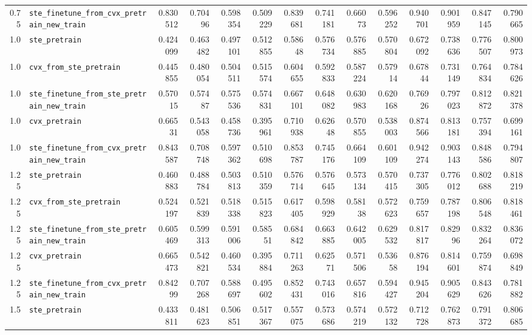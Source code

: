 \begin{longtable}{@{}r l *{12}{r}@{}}
0.75 & \texttt{ste\_finetune\_from\_cvx\_pretrain\_new\_train} & 0.830512 & 0.70496 & 0.598354 & 0.509229 & 0.839681 & 0.741181 & 0.66073 & 0.596252 & 0.940701 & 0.901959 & 0.847145 & 0.790665 \\
1.0 & \texttt{ste\_pretrain} & 0.424099 & 0.463482 & 0.497101 & 0.512855 & 0.58648 & 0.576734 & 0.576885 & 0.570804 & 0.672092 & 0.738636 & 0.776507 & 0.800973 \\
1.0 & \texttt{cvx\_from\_ste\_pretrain} & 0.445855 & 0.480054 & 0.504511 & 0.515574 & 0.604655 & 0.592833 & 0.587224 & 0.57914 & 0.67844 & 0.731149 & 0.764834 & 0.784626 \\
1.0 & \texttt{ste\_finetune\_from\_ste\_pretrain\_new\_train} & 0.57015 & 0.57487 & 0.575536 & 0.574831 & 0.667101 & 0.648082 & 0.630983 & 0.620168 & 0.76926 & 0.797023 & 0.812872 & 0.821378 \\
1.0 & \texttt{cvx\_pretrain} & 0.66531 & 0.543058 & 0.458736 & 0.395961 & 0.710938 & 0.62648 & 0.570855 & 0.538003 & 0.874566 & 0.813181 & 0.757394 & 0.699161 \\
1.0 & \texttt{ste\_finetune\_from\_cvx\_pretrain\_new\_train} & 0.843587 & 0.708748 & 0.597362 & 0.510698 & 0.853787 & 0.745176 & 0.664109 & 0.601109 & 0.942274 & 0.903143 & 0.848586 & 0.794807 \\
1.25 & \texttt{ste\_pretrain} & 0.460883 & 0.488784 & 0.503813 & 0.510359 & 0.576714 & 0.576645 & 0.573134 & 0.570415 & 0.737305 & 0.776012 & 0.802688 & 0.818219 \\
1.25 & \texttt{cvx\_from\_ste\_pretrain} & 0.524197 & 0.521839 & 0.518338 & 0.515823 & 0.617405 & 0.598929 & 0.58138 & 0.572623 & 0.759657 & 0.787198 & 0.806548 & 0.818461 \\
1.25 & \texttt{ste\_finetune\_from\_ste\_pretrain\_new\_train} & 0.605469 & 0.599313 & 0.591006 & 0.58551 & 0.684842 & 0.663885 & 0.642005 & 0.629532 & 0.817817 & 0.82996 & 0.832264 & 0.836072 \\
1.25 & \texttt{cvx\_pretrain} & 0.665473 & 0.542821 & 0.460534 & 0.395884 & 0.711263 & 0.62571 & 0.571506 & 0.53658 & 0.876194 & 0.814601 & 0.759874 & 0.698849 \\
1.25 & \texttt{ste\_finetune\_from\_cvx\_pretrain\_new\_train} & 0.84299 & 0.707268 & 0.588697 & 0.495602 & 0.852431 & 0.743016 & 0.657816 & 0.594427 & 0.945204 & 0.905629 & 0.843626 & 0.781882 \\
1.5 & \texttt{ste\_pretrain} & 0.433811 & 0.481623 & 0.506851 & 0.517367 & 0.557075 & 0.573686 & 0.574219 & 0.572132 & 0.712728 & 0.762873 & 0.791372 & 0.806685 \\

\end{longtable}
